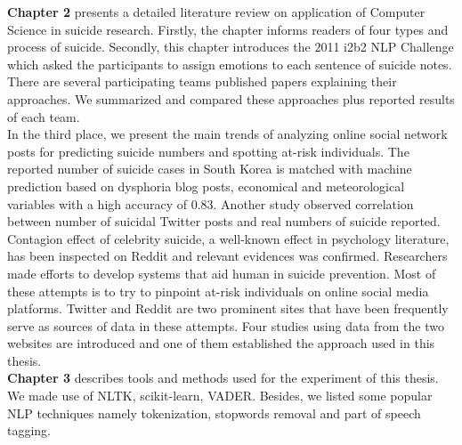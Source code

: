 \textbf{Chapter 2} presents a detailed literature review on application of Computer Science in suicide research. Firstly, the chapter informs readers of four types and process of suicide. Secondly, this chapter introduces the 2011 i2b2 NLP Challenge which asked the participants to assign emotions to each sentence of suicide notes. There are several participating teams published papers explaining their approaches. We summarized and compared these approaches plus reported results of each team.\\
In the third place, we present the main trends of analyzing online social network posts for predicting suicide numbers and spotting at-risk individuals. The reported number of suicide cases in South Korea is matched with machine prediction based on dysphoria blog posts, economical and meteorological variables with a high accuracy of 0.83. Another study observed correlation between number of suicidal Twitter posts and real numbers of suicide reported.\\
Contagion effect of celebrity suicide, a well-known effect in psychology literature, has been inspected on Reddit and relevant evidences was confirmed. Researchers made efforts to develop systems that aid human in suicide prevention. Most of these attempts is to try to pinpoint at-risk individuals on online social media platforms. Twitter and Reddit are two prominent sites that have been frequently serve as sources of data in these attempts. Four studies using data from the two websites are introduced and one of them established the approach used in this thesis.\\

\textbf{Chapter 3} describes tools and methods used for the experiment of this thesis. We made use of NLTK, scikit-learn, VADER. Besides, we listed some popular NLP techniques namely tokenization, stopwords removal and part of speech tagging.\\

